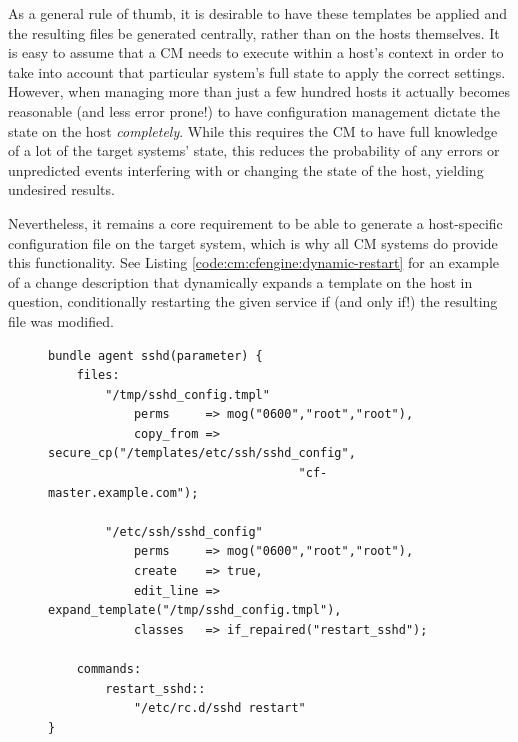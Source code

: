 As a general rule of thumb, it is desirable to have
these templates be applied and the resulting files be
generated centrally, rather than on the hosts
themselves.  It is easy to assume that a CM needs to
execute within a host's context in order to take into
account that particular system's full state to apply
the correct settings.  However, when managing more
than just a few hundred hosts it actually becomes
reasonable (and less error prone!) to have
configuration management dictate the state on the
host {\em completely}.  While this requires the CM to
have full knowledge of a lot of the target systems'
state, this reduces the probability of any errors or
unpredicted events interfering with or changing the
state of the host, yielding undesired results.

Nevertheless, it remains a core requirement to be able
to generate a host-specific configuration file on the
target system, which is why all CM systems do provide
this functionality.  See Listing
\ref{code:cm:cfengine:dynamic-restart} for an example
of a change description that dynamically expands a
template on the host in question, conditionally
restarting the given service if (and only if!) the
resulting file was modified.


\begin{figure}[!t]
\begin{minipage}{.98\linewidth}
\begin{lstlisting}[basicstyle=\scriptsize,label=code:cm:cfengine:dynamic-restart,caption={[A
CFEngine ``agent bundle'']An ``agent bundle'',
CFEngine's way to express user defined change
descriptions that install an \manpage{sshd\_config(5)}
file by way of copying a template from the
configuration master to the local system and expanding
it in place before finally restarting \manpage{sshd(8)} if necessary.}]
bundle agent sshd(parameter) {
    files:
        "/tmp/sshd_config.tmpl"
            perms     => mog("0600","root","root"),
            copy_from => secure_cp("/templates/etc/ssh/sshd_config",
                                   "cf-master.example.com");

        "/etc/ssh/sshd_config"
            perms     => mog("0600","root","root"),
            create    => true,
            edit_line => expand_template("/tmp/sshd_config.tmpl"),
            classes   => if_repaired("restart_sshd");

    commands:
        restart_sshd::
            "/etc/rc.d/sshd restart"
}
\end{lstlisting}
\end{minipage}
\end{figure}

